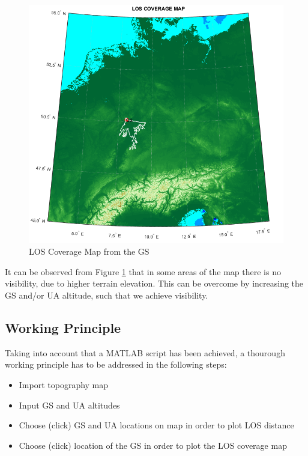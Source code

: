 \begin{figure}[H]
	\centering
	\includegraphics[scale=0.5]{figures/cov_map1.png}
	\caption{LOS Coverage Map from the GS}
   	\label{fig:los_area}
\end{figure}

It can be observed from Figure \ref{fig:los_area} that in some areas of the map there is no visibility, due to higher terrain elevation. This can be overcome by increasing the GS and/or UA altitude, such that we achieve visibility.  

\subsection{Working Principle}
Taking into account that a MATLAB script has been achieved, a thourough working principle has to be addressed in the following steps:
\begin{itemize}
	\item Import topography map 
	\item Input GS and UA altitudes
	\item Choose (click) GS and UA locations on map in order to plot LOS distance
	\item Choose (click) location of the GS in order to plot the LOS coverage map
\end{itemize}